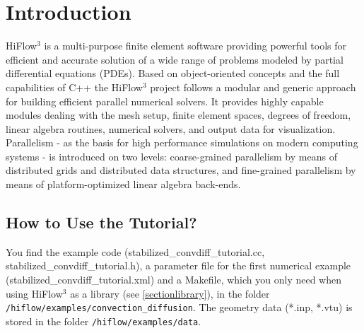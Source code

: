 \documentclass[a4paper, 11pt, twoside]{article}
\begin{document}
\pagestyle{empty}



\tableofcontents

\newpage
\pagestyle{plain}

\vspace{0.5cm}

\section{Introduction}

HiFlow$^3$ is a multi-purpose finite element software providing powerful tools for efficient and accurate solution of a wide range of problems modeled by partial differential equations (PDEs). Based on object-oriented concepts and the full capabilities of C++ the HiFlow$^3$ project follows a modular and generic approach for building efficient parallel numerical solvers. It provides highly capable modules dealing with the mesh setup, finite element spaces, degrees of freedom, linear algebra routines, numerical solvers, and output data for visualization. Parallelism - as the basis for high performance simulations on modern computing systems - is introduced on two levels: coarse-grained parallelism by means of distributed grids and distributed data structures, and fine-grained parallelism by means of platform-optimized linear algebra back-ends.

\subsection{How to Use the Tutorial?}
You find the example code (stabilized\_convdiff\_tutorial.cc, stabilized\_convdiff\_tutorial.h), a parameter file for the first numerical example (stabilized\_convdiff\_tutorial.xml) and a Makefile, which you only need when using HiFlow$^3$ as a library (see \ref{sectionlibrary}), in the folder \newline \verb'/hiflow/examples/convection_diffusion'. The geometry data (*.inp, *.vtu) is stored in the folder \verb'/hiflow/examples/data'.
\end{document}
